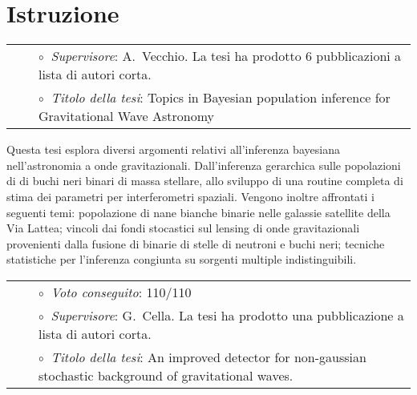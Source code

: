 \section{Istruzione}

\vspace{-0.1cm}
\begin{tabular}{rcl}
&\hspace{0.4cm} &$\circ\;\;${\textit{Supervisore}}: A.~Vecchio. La tesi ha prodotto 6 pubblicazioni a lista di autori corta.
\\
&\hspace{0.4cm} &$\circ\;\;${\textit{Titolo della tesi}}:
Topics in Bayesian population inference for Gravitational Wave Astronomy
\end{tabular}
\vspace{0.2cm}

Questa tesi esplora diversi argomenti relativi all'inferenza bayesiana nell'astronomia a onde gravitazionali. Dall'inferenza gerarchica sulle popolazioni di di buchi neri binari di massa stellare, allo sviluppo di una routine completa di stima dei parametri per interferometri spaziali. Vengono inoltre affrontati i seguenti temi: popolazione di nane bianche binarie nelle galassie satellite della Via Lattea; vincoli dai fondi stocastici sul lensing di onde gravitazionali provenienti dalla fusione di binarie di stelle di neutroni e buchi neri; tecniche statistiche per l'inferenza congiunta su sorgenti multiple indistinguibili.

\vspace{0.2cm}
\vspace{-0.1cm}
\begin{tabular}{rcl}
&\hspace{0.4cm} &$\circ\;\;${\textit{Voto conseguito}}: 110/110\\
&\hspace{0.4cm} &$\circ\;\;${\textit{Supervisore}}: G.~Cella. La tesi ha prodotto una pubblicazione a lista di autori corta.\\
&\hspace{0.4cm} &$\circ\;\;${\textit{Titolo della tesi}}: 
An improved detector for non-gaussian stochastic background of gravitational waves.
\end{tabular}
\vspace{0.2cm}

